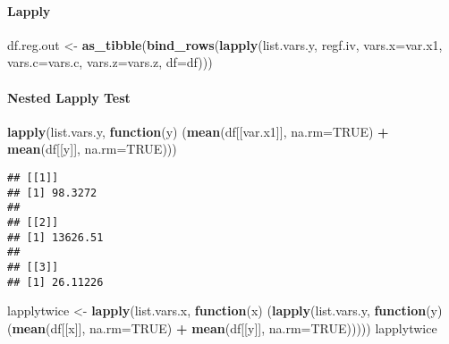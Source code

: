 \documentclass[
]{book}
\newenvironment{Shaded}{\begin{snugshade}}{\end{snugshade}}
\newcommand{\ControlFlowTok}[1]{\textcolor[rgb]{0.13,0.29,0.53}{\textbf{#1}}}
\newcommand{\DataTypeTok}[1]{\textcolor[rgb]{0.13,0.29,0.53}{#1}}
\newcommand{\KeywordTok}[1]{\textcolor[rgb]{0.13,0.29,0.53}{\textbf{#1}}}
\newcommand{\NormalTok}[1]{#1}
\newcommand{\OperatorTok}[1]{\textcolor[rgb]{0.81,0.36,0.00}{\textbf{#1}}}
\newcommand{\OtherTok}[1]{\textcolor[rgb]{0.56,0.35,0.01}{#1}}
\newcommand{\StringTok}[1]{\textcolor[rgb]{0.31,0.60,0.02}{#1}}
\begin{document}
\hypertarget{lapply}{%
\paragraph{Lapply}\label{lapply}}

\begin{Shaded}
\begin{Highlighting}[]
\NormalTok{df.reg.out <-}\StringTok{ }\KeywordTok{as_tibble}\NormalTok{(}\KeywordTok{bind_rows}\NormalTok{(}\KeywordTok{lapply}\NormalTok{(list.vars.y, regf.iv, }\DataTypeTok{vars.x=}\NormalTok{var.x1, }\DataTypeTok{vars.c=}\NormalTok{vars.c, }\DataTypeTok{vars.z=}\NormalTok{vars.z, }\DataTypeTok{df=}\NormalTok{df)))}
\end{Highlighting}
\end{Shaded}

\hypertarget{nested-lapply-test}{%
\paragraph{Nested Lapply Test}\label{nested-lapply-test}}

\begin{Shaded}
\begin{Highlighting}[]
\KeywordTok{lapply}\NormalTok{(list.vars.y, }\ControlFlowTok{function}\NormalTok{(y) (}\KeywordTok{mean}\NormalTok{(df[[var.x1]], }\DataTypeTok{na.rm=}\OtherTok{TRUE}\NormalTok{) }\OperatorTok{+}\StringTok{ }\KeywordTok{mean}\NormalTok{(df[[y]], }\DataTypeTok{na.rm=}\OtherTok{TRUE}\NormalTok{)))}
\end{Highlighting}
\end{Shaded}

\begin{verbatim}
## [[1]]
## [1] 98.3272
## 
## [[2]]
## [1] 13626.51
## 
## [[3]]
## [1] 26.11226
\end{verbatim}

\begin{Shaded}
\begin{Highlighting}[]
\NormalTok{lapplytwice <-}\StringTok{ }\KeywordTok{lapply}\NormalTok{(list.vars.x, }\ControlFlowTok{function}\NormalTok{(x) (}\KeywordTok{lapply}\NormalTok{(list.vars.y, }\ControlFlowTok{function}\NormalTok{(y) (}\KeywordTok{mean}\NormalTok{(df[[x]], }\DataTypeTok{na.rm=}\OtherTok{TRUE}\NormalTok{) }\OperatorTok{+}\StringTok{ }\KeywordTok{mean}\NormalTok{(df[[y]], }\DataTypeTok{na.rm=}\OtherTok{TRUE}\NormalTok{)))))}
\NormalTok{lapplytwice}
\end{Highlighting}
\end{Shaded}
\end{document}
